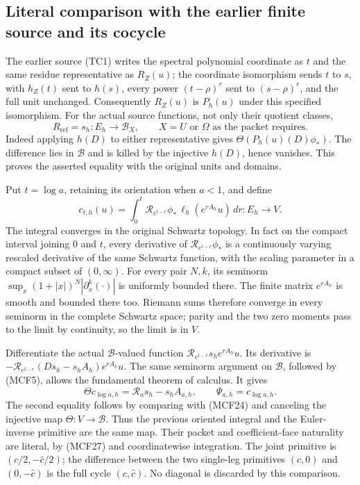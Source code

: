 
\subsection{Literal comparison with the earlier finite source and its cocycle}

The earlier source (TC1) writes the spectral polynomial coordinate as
$t$ and the same residue representative as $R_Z(u)$; the coordinate
isomorphism sends $t$ to $s$, with $h_Z(t)$ sent to $h(s)$, every
power $(t-\rho)^r$ sent to $(s-\rho)^r$, and the full unit unchanged.
Consequently $R_Z(u)$ is $P_h(u)$ under this specified isomorphism.
For the actual source functions, not only their quotient classes,
\[
R_{\mathrm{ref}}=s_h:E_h\longrightarrow\mathscr B_X,
\qquad X=U\text{ or }\Omega\text{ as the packet requires}.
\tag{MCF42}
\]
Indeed applying $h(D)$ to either representative gives
$\Theta(P_h(u)(D)\phi_*)$.  The difference lies in $\mathscr B$
and is killed by the injective $h(D)$, hence vanishes.  This proves
the asserted equality with the original units and domains.

Put $t=\log a$, retaining its orientation when $a<1$, and define
\[
c_{t,h}(u)=\int_0^t\mathcal R_{e^{t-r}}\phi_*\,
                  \ell_h(e^{rA_h}u)\,dr:E_h\longrightarrow V.
\tag{MCF43}
\]
The integral converges in the original Schwartz topology.  In fact
on the compact interval joining $0$ and $t$, every derivative of
$\mathcal R_{e^{t-r}}\phi_*$ is a continuously varying rescaled
derivative of the same Schwartz function, with the scaling parameter
in a compact subset of $(0,\infty)$.  For every pair $N,k$, its
seminorm $\sup_x(1+|x|)^N|\partial_x^k(\cdot)|$ is uniformly
bounded there.  The finite matrix $e^{rA_h}$ is smooth and bounded
there too.  Riemann sums therefore converge in every seminorm in
the complete Schwartz space; parity and the two zero moments pass
to the limit by continuity, so the limit is in $V$.

Differentiate the actual $\mathscr B$-valued function
$\mathcal R_{e^{t-r}}s_he^{rA_h}u$.  Its derivative is
$-\mathcal R_{e^{t-r}}(Ds_h-s_hA_h)e^{rA_h}u$.
The same seminorm argument on $\mathscr B$, followed by (MCF5),
allows the fundamental theorem of calculus.  It gives
\[
\Theta c_{\log a,h}=\mathcal R_as_h-s_hA_{a,h},\qquad
\Psi_{a,h}=c_{\log a,h}.
\tag{MCF44}
\]
The second equality follows by comparing with (MCF24) and canceling
the injective map $\Theta:V\to\mathscr B$.  Thus the previous
oriented integral and the Euler-inverse primitive are the same map.
Their packet and coefficient-face naturality are literal, by
(MCF27) and coordinatewise integration.  The joint primitive is
$(c/2,-\widehat c/2)$; the difference between the two single-leg
primitives $(c,0)$ and $(0,-\widehat c)$ is the full cycle
$(c,\widehat c)$.  No diagonal is discarded by this comparison.

